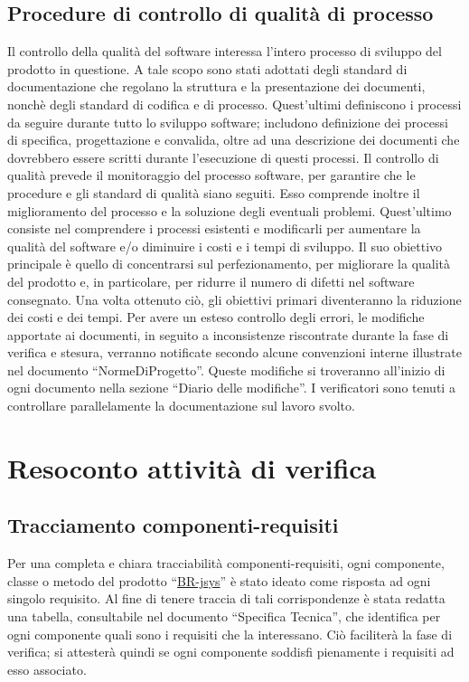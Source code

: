 \section{Procedure di controllo di qualit\`a di processo}
Il controllo della qualit\`a del software interessa l'intero processo di sviluppo del prodotto in questione. A tale scopo sono stati adottati degli standard di documentazione che regolano la struttura e la presentazione dei documenti, nonch\`e degli standard di codifica e di processo. Quest'ultimi definiscono i processi da seguire durante tutto lo sviluppo software; includono definizione dei processi di specifica, progettazione e convalida, oltre ad una descrizione dei documenti che dovrebbero essere scritti durante l'esecuzione di questi processi. Il controllo di qualit\`a prevede il monitoraggio del processo software, per garantire che le procedure e gli standard di qualit\`a siano seguiti. Esso comprende inoltre il miglioramento del processo e la soluzione degli eventuali problemi. Quest'ultimo consiste nel comprendere i processi esistenti e modificarli per aumentare la qualit\`a del software e/o diminuire i costi e i tempi di sviluppo. Il suo obiettivo principale \`e quello di concentrarsi sul perfezionamento, per migliorare la qualit\`a del prodotto e, in particolare, per ridurre il numero di difetti nel software consegnato. Una volta ottenuto ci\`o, gli obiettivi primari diventeranno la riduzione dei costi e dei tempi.
Per avere un esteso controllo degli errori, le modifiche apportate ai documenti, in seguito a inconsistenze riscontrate durante la fase di verifica e stesura, verranno notificate secondo alcune convenzioni interne illustrate nel documento ``NormeDiProgetto''. Queste modifiche si troveranno all'inizio di ogni documento nella sezione ``Diario delle modifiche''. I verificatori sono tenuti a controllare parallelamente la documentazione sul lavoro svolto.

\chapter{Resoconto attivit\`a di verifica}
\section{Tracciamento componenti-requisiti}
Per una completa e chiara tracciabilit\`a componenti-requisiti, ogni componente, classe o metodo del prodotto ``\underline{BR-jsys}'' \`e stato ideato come risposta ad ogni singolo requisito. Al fine di tenere traccia di tali corrispondenze \`e stata redatta una tabella, consultabile nel documento ``Specifica Tecnica'', che identifica per ogni componente quali sono i requisiti che la interessano. Ci\`o faciliter\`a la fase di verifica; si attester\`a quindi se ogni componente soddisfi pienamente i requisiti ad esso associato.
